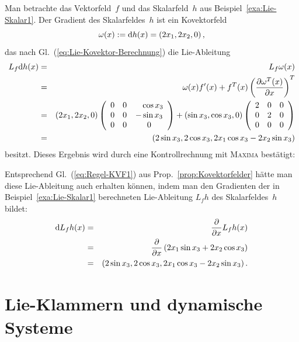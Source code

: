 \begin{example}
\label{exa:Lie-Kovektor}Man betrachte das Vektorfeld~$f$ und das
Skalarfeld~$h$ aus Beispiel~\ref{exa:Lie-Skalar1}. Der Gradient
des Skalarfeldes~$h$ ist ein Kovektorfeld 
\[
\omega(x):=\mathrm{d} h(x)=\left(2x_{1},2x_{2},0\right),
\]
das nach Gl.~(\ref{eq:Lie-Kovektor-Berechnung}) die Lie-Ableitung
\begin{eqnarray*}
L_{f}\D h(x) & = & L_{f}\omega(x)\\
 & = & \omega(x)f^{\prime}(x)+f^{T}(x)\left(\frac{\partial\omega^{T}(x)}{\partial x}\right)^{T}\\
 & = & \left(2x_{1},2x_{2},0\right)\left(\begin{array}{ccc}
0 & 0 & \phantom{{-}}\cos x_{3}\\
0 & 0 & -\sin x_{3}\\
0 & 0 & 0
\end{array}\right)+\left(\sin x_{3},\cos x_{3},0\right)\left(\begin{array}{ccc}
2 & 0 & 0\\
0 & 2 & 0\\
0 & 0 & 0
\end{array}\right)\\
 & = & \left(2\sin x_{3},2\cos x_{3},2x_{1}\cos x_{3}-2x_{2}\sin x_{3}\right)
\end{eqnarray*}
besitzt. Dieses Ergebnis wird durch eine Kontrollrechnung mit \textsc{Maxima}
bestätigt:

\begin{maxima}\end{maxima}

Entsprechend Gl.~(\ref{eq:Regel-KVF1}) aus Prop.~\ref{prop:Kovektorfelder}
hätte man diese Lie-Ableitung auch erhalten können, indem man den
Gradienten der in Beispiel~\ref{exa:Lie-Skalar1} berechneten Lie-Ableitung
$L_{f}h$ des Skalarfeldes~$h$ bildet:
\begin{eqnarray*}
\mathrm{d} L_{f}h(x) & = & \frac{\partial}{\partial x}L_{f}h(x)\\
 & = & \frac{\partial}{\partial x}\left(2x_{1}\sin x_{3}+2x_{2}\cos x_{3}\right)\\
 & = & \left(2\sin x_{3},2\cos x_{3},2x_{1}\cos x_{3}-2x_{2}\sin x_{3}\right).
\end{eqnarray*}
\end{example}

\section{\label{sec:Lie-Klammern-dynamische-Systeme}Lie-Klammern und dynamische
Systeme}


